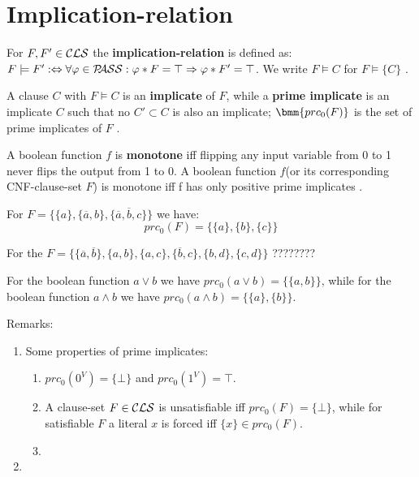 \documentclass[12pt]{book}
\begin{document}
\section{Implication-relation}
\label{sec:Implication-relation}

\begin{defi}\label{def:imp1}
      For $F, F' \in \mathcal{CLS}$ the \textbf{implication-relation} is defined as: 
      $F \models F' : \Leftrightarrow  \forall \varphi \in \mathcal{P\hspace{-0.32em}ASS} : \varphi * F = \top \Rightarrow \varphi * F' = \top$. 
      We write $F \models C$ for $F \models \{ C \}$ \cite{h5}.
\end{defi}
\begin{defi}\label{def:imp2}
      A clause $C$ with $F \models C$ is an \textbf{implicate} of $F$, while a \textbf{prime implicate}
      is an implicate $C$ such that no $C' \subset C$ is also an implicate; $\bmm{prc_0(F)}$ is the set of prime implicates of $F$ \cite{h5}.
\end{defi}
\begin{defi}\label{def:imp3}
      A boolean function $f$ is \textbf{monotone} iff flipping any input variable from 0 to 1 never flips the output from 1 to 0.
	  A boolean function $f$(or its corresponding CNF-clause-set $F$) is monotone iff f has only positive prime implicates \cite{h8}.
\end{defi}
\begin{examp}\label{exp:imp3}
      For $F = \{ \{a\}, \{ \overline a, b \}, \{ \overline a, \overline b, c \} \}$ we have:
      $$ prc_0(F) = \{ \{a\}, \{ b \}, \{ c \} \} $$
\end{examp}
\begin{examp}\label{exp:imp3}
      For the $F= \{ \{ \overline a, \overline b \}, \{ a, b \}, \{ a, c \}, \{ \overline b, c\}, \{ b, d \}, \{ c, d \}\}$ 
      ????????
\end{examp}
\begin{examp}\label{exp:imp3}
      For the boolean function $ a \vee b$ we have $prc_0(a \vee b) = \{ \{a, b \} \}$, while for the boolean function 
	  $a \wedge b$ we have $prc_0(a \wedge b) = \{ \{ a \}, \{b\}\}$.
\end{examp}

Remarks:
\begin{enumerate}
      \item Some properties of prime implicates:
      \begin{enumerate}
	        \item $prc_0(0^V) = \{ \bot \}$ and $prc_0(1^V) = \top$.
			\item A clause-set $F \in \mathcal{CLS}$ is unsatisfiable iff $prc_0(F) = \{ \bot \}$, while for satisfiable $F$ a literal 
			$x$ is forced iff $\{ x \} \in prc_0(F)$.
			\item 
	  \end{enumerate}	 
      \item 
\end{enumerate}
\end{document}

